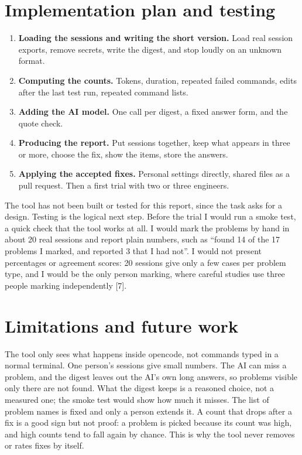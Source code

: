 \documentclass[10pt,twocolumn]{article}
\begin{document}
\section{Implementation plan and testing}
\begin{enumerate}
\item \textbf{Loading the sessions and writing the short version.} Load real session exports, remove secrets, write the digest, and stop loudly on an unknown format.
\item \textbf{Computing the counts.} Tokens, duration, repeated failed commands, edits after the last test run, repeated command lists.
\item \textbf{Adding the AI model.} One call per digest, a fixed answer form, and the quote check.
\item \textbf{Producing the report.} Put sessions together, keep what appears in three or more, choose the fix, show the items, store the answers.
\item \textbf{Applying the accepted fixes.} Personal settings directly, shared files as a pull request. Then a first trial with two or three engineers.
\end{enumerate}

The tool has not been built or tested for this report, since the task asks for a design. Testing is the logical next step. Before the trial I would run a smoke test, a quick check that the tool works at all. I would mark the problems by hand in about 20 real sessions and report plain numbers, such as ``found 14 of the 17 problems I marked, and reported 3 that I had not''. I would not present percentages or agreement scores: 20 sessions give only a few cases per problem type, and I would be the only person marking, where careful studies use three people marking independently [7].

\section{Limitations and future work}
The tool only sees what happens inside opencode, not commands typed in a normal terminal. One person's sessions give small numbers. The AI can miss a problem, and the digest leaves out the AI's own long answers, so problems visible only there are not found. What the digest keeps is a reasoned choice, not a measured one; the smoke test would show how much it misses. The list of problem names is fixed and only a person extends it. A count that drops after a fix is a good sign but not proof: a problem is picked because its count was high, and high counts tend to fall again by chance. This is why the tool never removes or rates fixes by itself.
\end{document}
